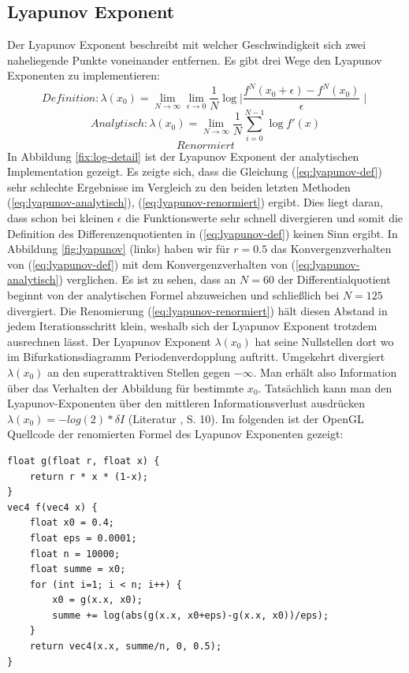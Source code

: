 \documentclass{scrartcl}
\begin{document}
\subsection{Lyapunov Exponent}
Der Lyapunov Exponent beschreibt mit welcher Geschwindigkeit sich zwei naheliegende Punkte voneinander entfernen. 
Es gibt drei Wege den Lyapunov Exponenten zu implementieren:
\begin{equation}
Definition: \lambda(x_0) = \lim_{N \rightarrow \infty}\lim_{\epsilon \rightarrow 0} \frac{1}{N}\log{\mid \frac{f^N(x_0+\epsilon)- f^N(x_0)}{\epsilon} \mid} 
\label{eq:lyapunov-def}
\end{equation}
\begin{equation}
Analytisch: \lambda(x_0) = \lim_{N \rightarrow \infty} \frac{1}{N} \sum_{i=0}^{N-1}  \log{f'(x)} 
\label{eq:lyapunov-analytisch}
\end{equation}
\begin{equation}
Renormiert
\label{eq:lyapunov-renormiert}
\end{equation}
In Abbildung \ref{fix:log-detail} ist der Lyapunov Exponent der analytischen Implementation gezeigt.
Es zeigte sich, dass die Gleichung (\ref{eq:lyapunov-def}) sehr schlechte Ergebnisse im Vergleich zu den beiden letzten Methoden (\ref{eq:lyapunov-analytisch}), (\ref{eq:lyapunov-renormiert}) ergibt.
Dies liegt daran, dass schon bei kleinen $\epsilon$ die Funktionswerte sehr schnell divergieren und somit die Definition des Differenzenquotienten in (\ref{eq:lyapunov-def}) keinen Sinn ergibt.
In Abbildung \ref{fig:lyapunov} (links) haben wir für $r=0.5$ das Konvergenzverhalten von (\ref{eq:lyapunov-def}) mit dem Konvergenzverhalten von (\ref{eq:lyapunov-analytisch}) verglichen. Es ist zu sehen, dass an $N=60$ der Differentialquotient beginnt von der analytischen Formel abzuweichen und schließlich bei $N=125$ divergiert.
Die Renomierung (\ref{eq:lyapunov-renormiert}) hält diesen Abstand in jedem Iterationsschritt klein, weshalb sich der Lyapunov Exponent trotzdem ausrechnen lässt.
Der Lyapunov Exponent $\lambda(x_0)$ hat seine Nullstellen dort wo im Bifurkationsdiagramm Periodenverdopplung auftritt. Umgekehrt divergiert $\lambda(x_0)$ an den superattraktiven Stellen gegen $-\infty$.
Man erhält also Information über das Verhalten der Abbildung für bestimmte $x_0$.
Tatsächlich kann man den Lyapunov-Exponenten über den mittleren Informationsverlust ausdrücken $\lambda(x_0)=-log(2)*\delta I$ (Literatur \parencite{versuchmappe}, S. 10).
Im folgenden ist der OpenGL Quellcode der renomierten Formel des Lyapunov Exponenten gezeigt:
\begin{lstlisting}
float g(float r, float x) {
    return r * x * (1-x);
}
vec4 f(vec4 x) {
    float x0 = 0.4;
    float eps = 0.0001;
    float n = 10000;
    float summe = x0;
    for (int i=1; i < n; i++) {
        x0 = g(x.x, x0);
        summe += log(abs(g(x.x, x0+eps)-g(x.x, x0))/eps);
    }
    return vec4(x.x, summe/n, 0, 0.5);
}
\end{lstlisting}
\end{document}
